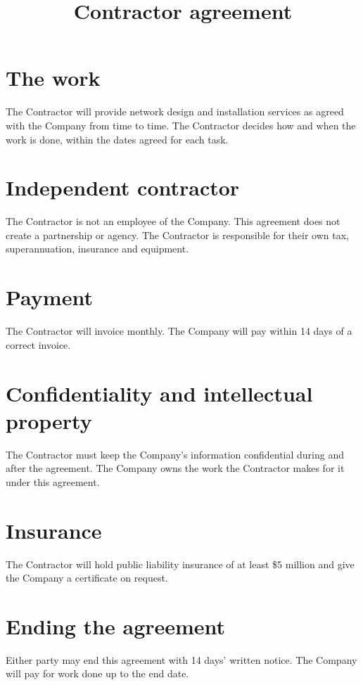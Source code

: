 \documentclass{jupiter-agreement}
\title{Contractor agreement}
\begin{document}
\maketitle
{}
\jprowend

\section{The work}
\clause The Contractor will provide network design and installation services as agreed with the Company from time to time.
\clause The Contractor decides how and when the work is done, within the dates agreed for each task.

\section{Independent contractor}
\clause The Contractor is not an employee of the Company. This agreement does not create a partnership or agency.
\clause The Contractor is responsible for their own tax, superannuation, insurance and equipment.

\section{Payment}
\clause The Contractor will invoice monthly. The Company will pay within 14 days of a correct invoice.

\section{Confidentiality and intellectual property}
\clause The Contractor must keep the Company's information confidential during and after the agreement.
\clause The Company owns the work the Contractor makes for it under this agreement.

\section{Insurance}
\clause The Contractor will hold public liability insurance of at least \$5 million and give the Company a certificate on request.

\section{Ending the agreement}
\clause Either party may end this agreement with 14 days' written notice.
\clause The Company will pay for work done up to the end date.

\end{document}
